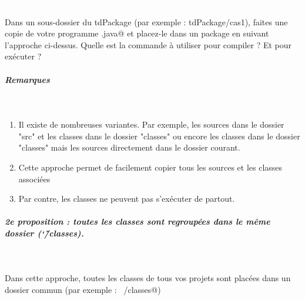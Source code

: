 \documentclass[11pt,a4paper]{article}
\begin{document}
					\textcolor{white}{.} \par
				
            \par
        
				Dans un sous-dossier du tdPackage
				(par exemple : tdPackage/cas1),
				faites une copie de votre programme 
				\verb@Hello.java@
				et placez-le dans un package en suivant
				l'approche ci-dessus.
				Quelle est la commande \`a utiliser pour compiler ?
				Et pour ex\'ecuter ?
			
            \par
        
			\par\medskip
			
		\subparagraph{Remarques} 
		
					\textcolor{white}{.} \par
				
            \par
        
					\begin{enumerate}
				
			\item 
					Il existe de nombreuses variantes.
					Par exemple, les sources dans le dossier
					"src" et les classes dans le dossier "classes"
					ou encore les classes dans le dossier "classes"
					mais les sources directement dans le dossier
					courant. 
				
			\item 
					Cette approche permet de facilement
					copier tous les sources et les classes associ\'ees
				
			\item 
					Par contre, les classes ne peuvent pas s'ex\'ecuter
					de partout.
			 	
					\end{enumerate}
				
			
		\subparagraph{2e proposition : toutes les classes sont regroup\'ees dans le m\^eme dossier (\char`\~/classes).} 
		
					\textcolor{white}{.} \par
				
            \par
        
				Dans cette approche, toutes les classes
				de tous vos projets sont plac\'ees dans un dossier commun
				(par exemple : \verb@~/classes@)
			
\end{document}
